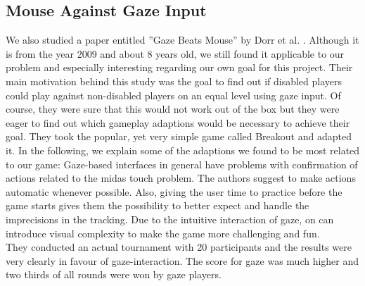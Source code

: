 \documentclass{sigchi}
\begin{document}
\subsection{Mouse Against Gaze Input}
We also studied a paper entitled ''Gaze Beats Mouse'' by Dorr et al. \cite{dorr2009gaze}. Although it is from the year 2009 and about 8 years old, we still found it applicable to our problem and especially interesting regarding our own goal for this project. Their main motivation behind this study was the goal to find out if disabled players could play against non-disabled players on an equal level using gaze input. Of course, they were sure that this would not work out of the box but they were eager to find out which gameplay adaptions would be necessary to achieve their goal. They took the popular, yet very simple game called Breakout and adapted it. In the following, we explain some of the adaptions we found to be most related to our game: Gaze-based interfaces in general have problems with confirmation of actions related to the midas touch problem. The authors suggest to make actions automatic whenever possible. Also, giving the user time to practice before the game starts gives them the possibility to better expect and handle the imprecisions in the tracking. Due to the intuitive interaction of gaze, on can introduce visual complexity to make the game more challenging and fun.\\
They conducted an actual tournament with 20 participants and the results were very clearly in favour of gaze-interaction. The score for gaze was much higher and two thirds of all rounds were won by gaze players.
\end{document}
